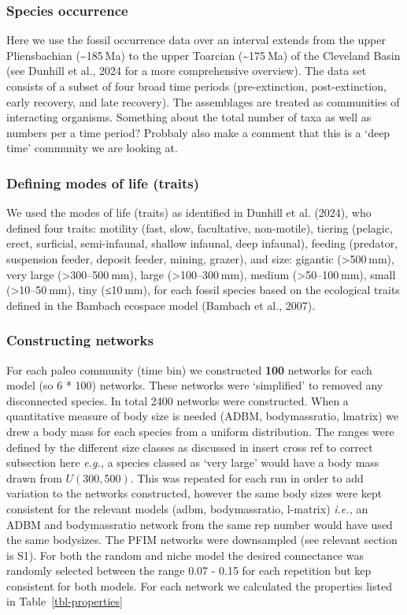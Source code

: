 \documentclass[
]{article}
\begin{document}
\subsubsection{Species occurrence}\label{species-occurrence}

Here we use the fossil occurrence data over an interval extends from the
upper Pliensbachian (\textasciitilde185 Ma) to the upper Toarcian
(\textasciitilde175 Ma) of the Cleveland Basin (see Dunhill et al., 2024
for a more comprehensive overview). The data set consists of a subset of
four broad time periods (pre-extinction, post-extinction, early
recovery, and late recovery). The assemblages are treated as communities
of interacting organisms. Something about the total number of taxa as
well as numbers per a time period? Probbaly also make a comment that
this is a `deep time' community we are looking at.

\subsubsection{Defining modes of life
(traits)}\label{defining-modes-of-life-traits}

We used the modes of life (traits) as identified in Dunhill et al.
(2024), who defined four traits: motility (fast, slow, facultative,
non-motile), tiering (pelagic, erect, surficial, semi-infaunal, shallow
infaunal, deep infaunal), feeding (predator, suspension feeder, deposit
feeder, mining, grazer), and size: gigantic (\textgreater500 mm), very
large (\textgreater300--500 mm), large (\textgreater100--300 mm), medium
(\textgreater50--100 mm), small (\textgreater10--50 mm), tiny (≤10 mm),
for each fossil species based on the ecological traits defined in the
Bambach ecospace model (Bambach et al., 2007).

\subsubsection{Constructing networks}\label{constructing-networks}

For each paleo community (time bin) we constructed \textbf{100} networks
for each model (so 6 * 100) networks. These networks were `simplified'
to removed any disconnected species. In total 2400 networks were
constructed. When a quantitative measure of body size is needed (ADBM,
bodymassratio, lmatrix) we drew a body mass for each species from a
uniform distribution. The ranges were defined by the different size
classes as discussed in insert cross ref to correct subsection here
\emph{e.g.,} a species classed as `very large' would have a body mass
drawn from \(U(300, 500)\). This was repeated for each run in order to
add variation to the networks constructed, however the same body sizes
were kept consistent for the relevant models (adbm, bodymassratio,
l-matrix) \emph{i.e.,} an ADBM and bodymassratio network from the same
rep number would have used the same bodysizes. The PFIM networks were
downsampled (see relevant section is S1). For both the random and niche
model the desired connectance was randomly selected between the range
0.07 - 0.15 for each repetition but kep consistent for both models. For
each network we calculated the properties listed in
Table~\ref{tbl-properties}
\end{document}
